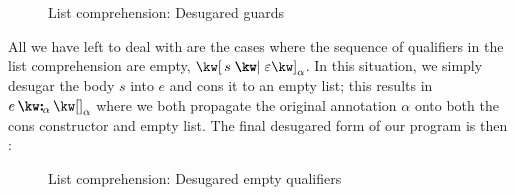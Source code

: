 \begin{figure}[H]
   \small
   
   \caption{List comprehension: Desugared guards}
   \label{fig:surface-language:example-3}
\end{figure}

All we have left to deal with are the cases where the sequence of qualifiers in the list comprehension are empty, $\annListComp{s}{\seqEmpty}{\alpha}$. In this situation, we simply desugar the body $s$ into $e$ and cons it to an empty list; this results in $\annCons{e}{\annNil{\alpha}}{\alpha}$ where we both propagate the original annotation $\alpha$ onto both the cons constructor and empty list. The final desugared form of our program is then :

\begin{figure}[H]
   \small
   
   \caption{List comprehension: Desugared empty qualifiers}
   \label{fig:surface-language:example-4}
\end{figure}

